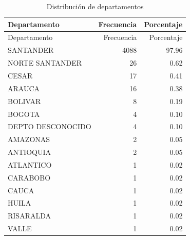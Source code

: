 \documentclass[
]{article}
\begin{document}
\begin{longtable}[]{@{}lrr@{}}
\caption{Distribución de departamentos}\tabularnewline
\toprule\noalign{}
Departamento & Frecuencia & Porcentaje \\
\midrule\noalign{}
\endfirsthead
\toprule\noalign{}
Departamento & Frecuencia & Porcentaje \\
\midrule\noalign{}
\endhead
\bottomrule\noalign{}
\endlastfoot
SANTANDER & 4088 & 97.96 \\
NORTE SANTANDER & 26 & 0.62 \\
CESAR & 17 & 0.41 \\
ARAUCA & 16 & 0.38 \\
BOLIVAR & 8 & 0.19 \\
BOGOTA & 4 & 0.10 \\
DEPTO DESCONOCIDO & 4 & 0.10 \\
AMAZONAS & 2 & 0.05 \\
ANTIOQUIA & 2 & 0.05 \\
ATLANTICO & 1 & 0.02 \\
CARABOBO & 1 & 0.02 \\
CAUCA & 1 & 0.02 \\
HUILA & 1 & 0.02 \\
RISARALDA & 1 & 0.02 \\
VALLE & 1 & 0.02 \\
\end{longtable}
\end{document}

